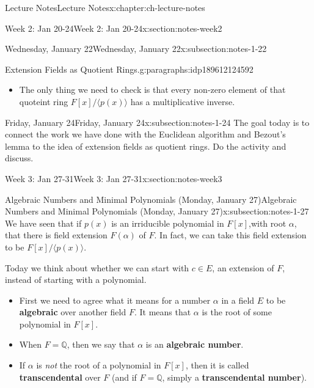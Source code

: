 \documentclass[oneside,11pt,]{book}
\newcommand{\terminology}[1]{\textbf{#1}}
\newcommand{\Q}{\mathbb{Q}}
\begin{document}
\begin{chapterptx}{Lecture Notes}{}{Lecture Notes}{}{}{x:chapter:ch-lecture-notes}
\begin{sectionptx}{Week 2: Jan 20-24}{}{Week 2: Jan 20-24}{}{}{x:section:notes-week2}
\begin{subsectionptx}{Wednesday, January 22}{}{Wednesday, January 22}{}{}{x:subsection:notes-1-22}
\begin{paragraphs}{Extension Fields as Quotient Rings.}{g:paragraphs:idp189612124592}
\begin{itemize}[label=\textbullet]
\item{}The only thing we need to check is that every non-zero element of that quoteint ring \(F[x]/\langle p(x) \rangle\) has a multiplicative inverse.%
\end{itemize}
%
\end{paragraphs}%
\end{subsectionptx}
%
%
\typeout{************************************************}
\typeout{************************************************}
%
\begin{subsectionptx}{Friday, January 24}{}{Friday, January 24}{}{}{x:subsection:notes-1-24}
The goal today is to connect the work we have done with the Euclidean algorithm and Bezout's lemma to the idea of extension fields as quotient rings.  Do the activity and discuss.%
\end{subsectionptx}
\end{sectionptx}
%
%
\typeout{************************************************}
\typeout{************************************************}
%
\begin{sectionptx}{Week 3: Jan 27-31}{}{Week 3: Jan 27-31}{}{}{x:section:notes-week3}
%
%
\typeout{************************************************}
\typeout{************************************************}
%
\begin{subsectionptx}{Algebraic Numbers and Minimal Polynomials (Monday, January 27)}{}{Algebraic Numbers and Minimal Polynomials (Monday, January 27)}{}{}{x:subsection:notes-1-27}
We have seen that if \(p(x)\) is an irriducible polynomial in \(F[x]\),with root \(\alpha\), that there is field extension \(F(\alpha)\) of \(F\).  In fact, we can take this field extension to be \(F[x]/\langle p(x) \rangle\).%
\par
Today we think about whether we can start with \(c \in E\), an extension of \(F\), instead of starting with a polynomial.%
\begin{itemize}[label=\textbullet]
\item{}First we need to agree what it means for a number \(\alpha\) in a field \(E\) to be \terminology{algebraic} over another field \(F\).  It means that \(\alpha\) is the root of some polynomial in \(F[x]\).%
\item{}When \(F = \Q\), then we say that \(\alpha\) is an \terminology{algebraic number}.%
\item{}If \(\alpha\) is \emph{not} the root of a polynomial in \(F[x]\), then it is called \terminology{transcendental} over \(F\) (and if \(F = \Q\), simply a \terminology{transcendental number}).%

\end{itemize}
\end{subsectionptx}
\end{sectionptx}
\end{chapterptx}
\end{document}
